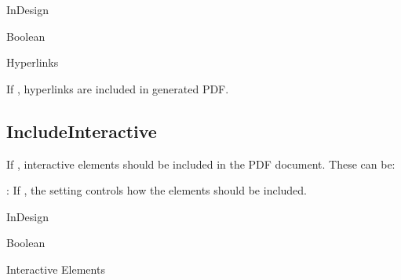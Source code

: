 \documentclass[letterpaper,12pt,english,openany,oneside]{sphinxmanual}
\begin{document}
\label{\detokenize{PDF_Create_NewNamespaces:supported-by-13}}

InDesign

\label{\detokenize{PDF_Create_NewNamespaces:type-13}}

Boolean

\label{\detokenize{PDF_Create_NewNamespaces:ui-name-13}}

Hyperlinks

\label{\detokenize{PDF_Create_NewNamespaces:default-value-12}}

\begin{sphinxVerbatim}[commandchars=\\\{\}]
\end{sphinxVerbatim}

If  , hyperlinks are included in generated PDF.


\subsection{IncludeInteractive}
\label{\detokenize{PDF_Create_NewNamespaces:includeinteractive}}
If  , interactive elements should be included in the PDF document. These can be:

 : If  , the  setting controls how the elements should be included.

\label{\detokenize{PDF_Create_NewNamespaces:supported-by-14}}

InDesign

\label{\detokenize{PDF_Create_NewNamespaces:type-14}}

Boolean

\label{\detokenize{PDF_Create_NewNamespaces:ui-name-14}}

Interactive Elements

\label{\detokenize{PDF_Create_NewNamespaces:default-value-13}}

\begin{sphinxVerbatim}[commandchars=\\\{\}]
\end{sphinxVerbatim}
\end{document}
